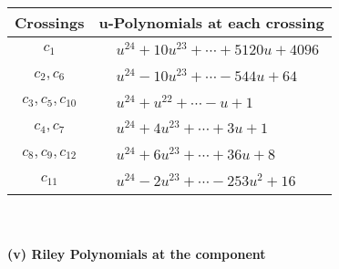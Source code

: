 \documentclass[1p]{elsarticle_modified}
\theoremstyle{definition}
\begin{document}
\begin{tabular}{m{50pt}|m{274pt}}
Crossings & \hspace{64pt}u-Polynomials at each crossing \\
\hline $$\begin{aligned}c_{1}\end{aligned}$$&$\begin{aligned}
&u^{24}+10 u^{23}+\cdots+5120 u+4096
\end{aligned}$\\
\hline $$\begin{aligned}c_{2},c_{6}\end{aligned}$$&$\begin{aligned}
&u^{24}-10 u^{23}+\cdots-544 u+64
\end{aligned}$\\
\hline $$\begin{aligned}c_{3},c_{5},c_{10}\end{aligned}$$&$\begin{aligned}
&u^{24}+u^{22}+\cdots- u+1
\end{aligned}$\\
\hline $$\begin{aligned}c_{4},c_{7}\end{aligned}$$&$\begin{aligned}
&u^{24}+4 u^{23}+\cdots+3 u+1
\end{aligned}$\\
\hline $$\begin{aligned}c_{8},c_{9},c_{12}\end{aligned}$$&$\begin{aligned}
&u^{24}+6 u^{23}+\cdots+36 u+8
\end{aligned}$\\
\hline $$\begin{aligned}c_{11}\end{aligned}$$&$\begin{aligned}
&u^{24}-2 u^{23}+\cdots-253 u^2+16
\end{aligned}$\\
\hline
\end{tabular}\\~\\
\newpage\renewcommand{\arraystretch}{1}
\flushleft \textbf{(v) Riley Polynomials at the component}\newline \\
\end{document}
